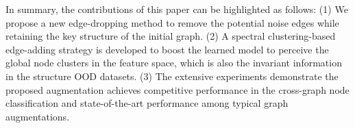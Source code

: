 In summary, the contributions of this paper can be highlighted as follows:
   (1) We propose a new edge-dropping method to remove the potential noise edges while retaining the key structure of the initial graph.
(2) A spectral clustering-based edge-adding strategy is developed to boost the learned model to perceive the global node clusters in the feature space, which is also the invariant information in the structure OOD datasets.
(3) The extensive experiments demonstrate the proposed augmentation achieves competitive performance in the cross-graph node classification and state-of-the-art performance among typical graph augmentations.

